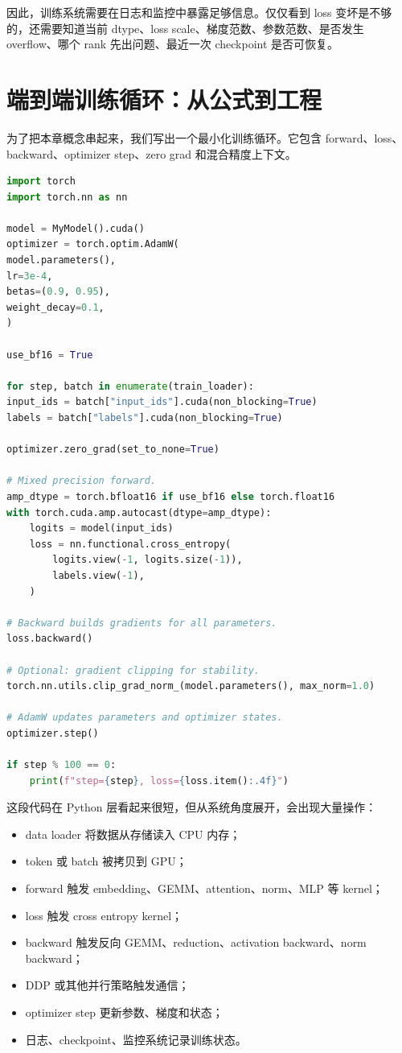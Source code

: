 因此，训练系统需要在日志和监控中暴露足够信息。仅仅看到 loss 变坏是不够的，还需要知道当前 dtype、loss scale、梯度范数、参数范数、是否发生 overflow、哪个 rank 先出问题、最近一次 checkpoint 是否可恢复。

\section{端到端训练循环：从公式到工程}
\label{sec:end-to-end-training-loop}

为了把本章概念串起来，我们写出一个最小化训练循环。它包含 forward、loss、backward、optimizer step、zero grad 和混合精度上下文。

\begin{lstlisting}[language=Python,caption={现代 PyTorch 训练循环骨架},label={lst:modern-pytorch-training-loop}]
import torch
import torch.nn as nn

model = MyModel().cuda()
optimizer = torch.optim.AdamW(
model.parameters(),
lr=3e-4,
betas=(0.9, 0.95),
weight_decay=0.1,
)

use_bf16 = True

for step, batch in enumerate(train_loader):
input_ids = batch["input_ids"].cuda(non_blocking=True)
labels = batch["labels"].cuda(non_blocking=True)

optimizer.zero_grad(set_to_none=True)

# Mixed precision forward.
amp_dtype = torch.bfloat16 if use_bf16 else torch.float16
with torch.cuda.amp.autocast(dtype=amp_dtype):
    logits = model(input_ids)
    loss = nn.functional.cross_entropy(
        logits.view(-1, logits.size(-1)),
        labels.view(-1),
    )

# Backward builds gradients for all parameters.
loss.backward()

# Optional: gradient clipping for stability.
torch.nn.utils.clip_grad_norm_(model.parameters(), max_norm=1.0)

# AdamW updates parameters and optimizer states.
optimizer.step()

if step % 100 == 0:
    print(f"step={step}, loss={loss.item():.4f}")

\end{lstlisting}

这段代码在 Python 层看起来很短，但从系统角度展开，会出现大量操作：

\begin{itemize}
\item data loader 将数据从存储读入 CPU 内存；
\item token 或 batch 被拷贝到 GPU；
\item forward 触发 embedding、GEMM、attention、norm、MLP 等 kernel；
\item loss 触发 cross entropy kernel；
\item backward 触发反向 GEMM、reduction、activation backward、norm backward；
\item DDP 或其他并行策略触发通信；
\item optimizer step 更新参数、梯度和状态；
\item 日志、checkpoint、监控系统记录训练状态。
\end{itemize}

